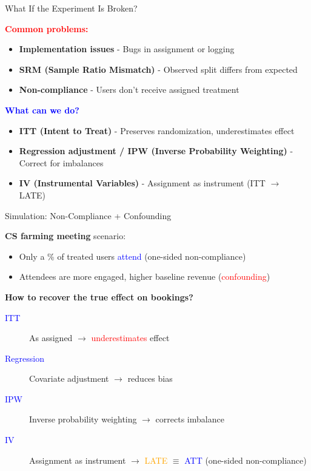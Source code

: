 \documentclass{beamer}
\newcommand{\blue}[1]{\textcolor{blue}{#1}}
\newcommand{\red}[1]{\textcolor{red}{#1}}
\newcommand{\orange}[1]{\textcolor{orange}{#1}}
\begin{document}
\begin{frame}{What If the Experiment Is Broken? }

\textbf{\red{Common problems:}}
\begin{itemize}
    \item \textbf{Implementation issues} - Bugs in assignment or logging
    \item \textbf{SRM (Sample Ratio Mismatch)} - Observed split differs from expected
    \item \textbf{Non-compliance} - Users don't receive assigned treatment
\end{itemize}

\vspace{0.2cm}
\textbf{\blue{What can we do?}}
\begin{itemize}
    \item \textbf{ITT (Intent to Treat)} - Preserves randomization, underestimates effect
    \item \textbf{Regression adjustment / IPW (Inverse Probability Weighting)} - Correct for imbalances
    \item \textbf{IV (Instrumental Variables)} - Assignment as instrument (ITT $\rightarrow$ LATE)
\end{itemize}

\end{frame}


\begin{frame}{Simulation: Non-Compliance + Confounding }

\textbf{CS farming meeting} scenario:
\begin{itemize}
    \item Only a \% of treated users \blue{attend} (one-sided non-compliance)
    \item Attendees are more engaged, higher baseline revenue (\red{confounding})
\end{itemize}

\textbf{How to recover the true effect on bookings?}

\begin{description}
    \item[\blue{ITT}] As assigned $\rightarrow$ \red{underestimates} effect
    \item[\blue{Regression}] Covariate adjustment $\rightarrow$ reduces bias
    \item[\blue{IPW}] Inverse probability weighting $\rightarrow$ corrects imbalance
    \item[\blue{IV}] Assignment as instrument $\rightarrow$ \orange{LATE} $\equiv$ \blue{ATT} (one-sided non-compliance)
\end{description}

\end{frame}
\end{document}
